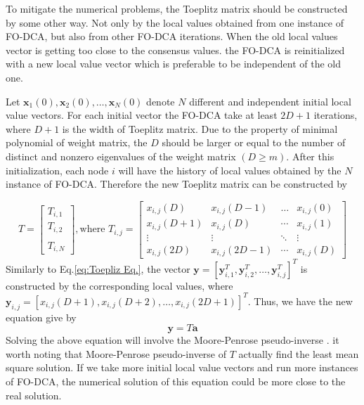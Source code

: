 To mitigate the numerical problems, the Toeplitz matrix should be
constructed by some other way. Not only by the local values obtained
from one instance of FO-DCA, but also from other FO-DCA iterations.
When the old local values vector is getting too close to the consensus
values. the FO-DCA is reinitialized with a new local value vector
which is preferable to be independent of the old one.

Let $\mathbf{x}_{1}\left(0\right),\mathbf{x}_{2}\left(0\right),\ldots,\mathbf{x}_{N}\left(0\right)$
denote $N$ different and independent initial local value vectors.
For each initial vector the FO-DCA take at least $2D+1$ iterations,
where $D+1$ is the width of Toeplitz matrix. Due to the property
of minimal polynomial of weight matrix, the $D$ should be larger
or equal to the number of distinct and nonzero eigenvalues of the
weight matrix $\left(D\geq m\right)$. After this initialization,
each node $i$ will have the history of local values obtained by the
$N$ instance of FO-DCA. Therefore the new Toeplitz matrix can be
constructed by

\[
T=\left[\begin{array}{c}
T_{i,1}\\
T_{i,2}\\
\\
T_{i,N}
\end{array}\right],\mbox{where }T_{i,j}=\left[\begin{array}{cccc}
x_{i,j}\left(D\right) & x_{i,j}\left(D-1\right) & \ldots & x_{i,j}\left(0\right)\\
x_{i,j}\left(D+1\right) & x_{i,j}\left(D\right) & \cdots & x_{i,j}\left(1\right)\\
\vdots & \vdots & \ddots & \vdots\\
x_{i,j}\left(2D\right) & x_{i,j}\left(2D-1\right) & \cdots & x_{i,j}\left(D\right)
\end{array}\right]
\]
Similarly to Eq.\ref{eq:Toepliz Eq.}, the vector $\mathbf{y}=\left[\mathbf{y}_{i,1}^{T},\mathbf{y}_{i,2}^{T},\ldots,\mathbf{y}_{i,j}^{T}\right]^{T}$
is constructed by the corresponding local values, where $\mathbf{y}_{i,j}=\left[x_{i,j}\left(D+1\right),x_{i,j}\left(D+2\right),\dots,x_{i,j}\left(2D+1\right)\right]^{T}.$
Thus, we have the new equation give by 
\begin{equation}
\mathbf{y}=T\mathbf{a}\label{eq:expanded Toeplitz Eq.}
\end{equation}
Solving the above equation will involve the Moore-Penrose pseudo-inverse
\cite{Piziak2007}. it worth noting that Moore-Penrose pseudo-inverse
of $T$ actually find the least mean square solution. If we take more
initial local value vectors and run more instances of FO-DCA, the
numerical solution of this equation could be more close to the real
solution. 


